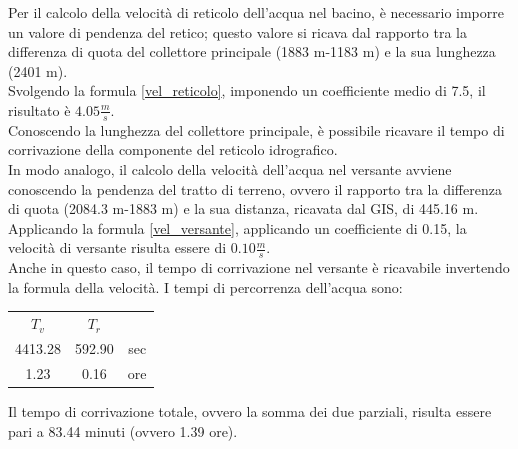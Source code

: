 Per il calcolo della velocità di reticolo dell'acqua nel bacino, è necessario imporre un valore di pendenza del retico; questo valore si ricava dal rapporto tra la differenza di quota del collettore principale (1883 m-1183 m) e la sua lunghezza (2401 m).\\
Svolgendo la formula \ref{vel_reticolo}, imponendo un coefficiente medio di 7.5, il risultato è $4.05 \frac{m}{s}$.\\
Conoscendo la lunghezza del collettore principale, è possibile ricavare il tempo di corrivazione della componente del reticolo idrografico.\\
In modo analogo, il calcolo della velocità dell'acqua nel versante avviene conoscendo la pendenza del tratto di terreno, ovvero il rapporto tra la differenza di quota (2084.3 m-1883 m) e la sua distanza, ricavata dal GIS, di 445.16 m.\\
Applicando la formula \ref{vel_versante}, applicando un coefficiente di 0.15, la velocità di versante risulta essere di $0.10 \frac{m}{s}$.\\
Anche in questo caso, il tempo di corrivazione nel versante è ricavabile invertendo la formula della velocità.
I tempi di percorrenza dell'acqua sono:
\begin{table}[H] \centering
    \begin{tabular}{ccc}
        \toprule
    \textbf{$T_v$} & \textbf{$T_r$} & {\color[HTML]{000000} } \\
    4413.28     & 592.90      & sec                     \\
    1.23        & 0.16        & ore       \\
    \bottomrule             
    \end{tabular}
    \end{table}
Il tempo di corrivazione totale, ovvero la somma dei due parziali, risulta essere pari a 83.44 minuti (ovvero 1.39 ore).

